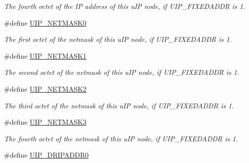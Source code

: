 \begin{CompactItemize}
\begin{CompactList}\small\item\em The fourth octet of the IP address of this u\-IP node, if UIP\_\-FIXEDADDR is 1. \item\end{CompactList}\item 
\hypertarget{a00071_ga9037ca68c44f934578de6f47ee1ae28}{
\#define \hyperlink{a00071_ga9037ca68c44f934578de6f47ee1ae28}{UIP\_\-NETMASK0}}
\label{a00071_ga9037ca68c44f934578de6f47ee1ae28}

\begin{CompactList}\small\item\em The first octet of the netmask of this u\-IP node, if UIP\_\-FIXEDADDR is 1. \item\end{CompactList}\item 
\hypertarget{a00071_g3a95ab93f7aaf939c637b40a0c5ddd2f}{
\#define \hyperlink{a00071_g3a95ab93f7aaf939c637b40a0c5ddd2f}{UIP\_\-NETMASK1}}
\label{a00071_g3a95ab93f7aaf939c637b40a0c5ddd2f}

\begin{CompactList}\small\item\em The second octet of the netmask of this u\-IP node, if UIP\_\-FIXEDADDR is 1. \item\end{CompactList}\item 
\hypertarget{a00071_g963493607725e1b3743191a623337580}{
\#define \hyperlink{a00071_g963493607725e1b3743191a623337580}{UIP\_\-NETMASK2}}
\label{a00071_g963493607725e1b3743191a623337580}

\begin{CompactList}\small\item\em The third octet of the netmask of this u\-IP node, if UIP\_\-FIXEDADDR is 1. \item\end{CompactList}\item 
\hypertarget{a00071_gfeb6c1f0c9d7006ea9cdbab6df59fe73}{
\#define \hyperlink{a00071_gfeb6c1f0c9d7006ea9cdbab6df59fe73}{UIP\_\-NETMASK3}}
\label{a00071_gfeb6c1f0c9d7006ea9cdbab6df59fe73}

\begin{CompactList}\small\item\em The fourth octet of the netmask of this u\-IP node, if UIP\_\-FIXEDADDR is 1. \item\end{CompactList}\item 
\hypertarget{a00071_g4302cec81a54df2288914026aa74895d}{
\#define \hyperlink{a00071_g4302cec81a54df2288914026aa74895d}{UIP\_\-DRIPADDR0}}
\label{a00071_g4302cec81a54df2288914026aa74895d}


\end{CompactItemize}
